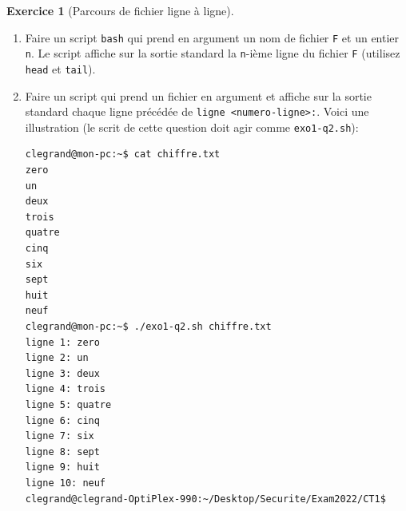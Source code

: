 \documentclass[a4paper,9pt]{article}
\newenvironment{terminal}{\color{white}\begin{snugshade*}}
{\end{snugshade*}\color{black}}
\theoremstyle{plain}
\theoremstyle{definition}
\newtheorem{exercice}{Exercice}
\begin{document}
\begin{exercice}[Parcours de fichier ligne à ligne]
  \begin{enumerate}
\item Faire un script \verb|bash| qui prend en argument un nom de fichier \verb|F| et un entier \verb|n|. Le script affiche sur la sortie standard la \verb|n|-ième ligne du fichier \verb|F| (utilisez \verb|head| et \verb|tail|). %
\item Faire un script qui prend un fichier en argument et affiche sur la sortie standard chaque ligne précédée de \verb|ligne <numero-ligne>:|. Voici une illustration (le scrit de cette question doit agir comme \verb|exo1-q2.sh|):
  \begin{small}
\begin{terminal}
\begin{verbatim}
clegrand@mon-pc:~$ cat chiffre.txt
zero
un
deux
trois
quatre
cinq
six
sept
huit
neuf
clegrand@mon-pc:~$ ./exo1-q2.sh chiffre.txt
ligne 1: zero
ligne 2: un
ligne 3: deux
ligne 4: trois
ligne 5: quatre
ligne 6: cinq
ligne 7: six
ligne 8: sept
ligne 9: huit
ligne 10: neuf
clegrand@clegrand-OptiPlex-990:~/Desktop/Securite/Exam2022/CT1$ 
\end{verbatim}
\end{terminal}
\end{small}

  \end{enumerate}
\end{exercice}

\newpage
\end{document}
